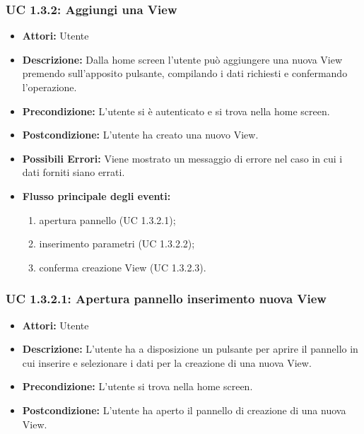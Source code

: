 \subsubsection{UC 1.3.2: Aggiungi una View}

\begin{itemize}
    \item \textbf{Attori:} Utente
    \item \textbf{Descrizione:} Dalla home screen l'utente può aggiungere una nuova View premendo sull'apposito pulsante, compilando i dati richiesti e confermando l'operazione.
    \item \textbf{Precondizione:} L'utente si è autenticato e si trova nella home screen.
    \item \textbf{Postcondizione:} L'utente ha creato una nuovo View.
	\item \textbf{Possibili Errori:}
    Viene mostrato un messaggio di errore nel caso in cui i dati forniti siano errati.
    \item \textbf{Flusso principale degli eventi:}

    \begin{enumerate}
        \item apertura pannello (UC 1.3.2.1);
        \item inserimento parametri (UC 1.3.2.2);
        \item conferma creazione View (UC 1.3.2.3).
    \end{enumerate}

\end{itemize}

\subsubsection{UC 1.3.2.1: Apertura pannello inserimento nuova View}

\begin{itemize}
    \item \textbf{Attori:} Utente
    \item \textbf{Descrizione:} L'utente ha a disposizione un pulsante per aprire il pannello in cui inserire e selezionare i dati per la creazione di una nuova View.
    \item \textbf{Precondizione:} L'utente si trova nella home screen.
    \item \textbf{Postcondizione:} L'utente ha aperto il pannello di creazione di una nuova View.
\end{itemize}


